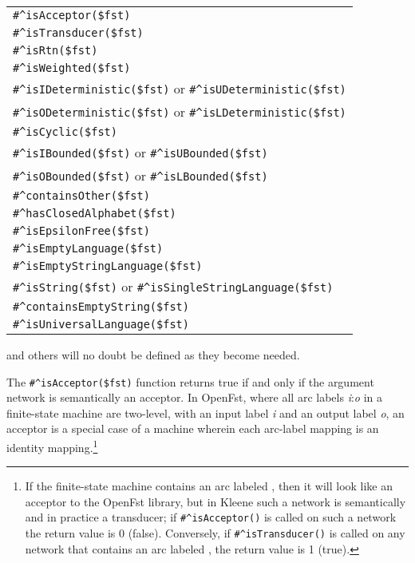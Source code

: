 \vspace{0.5cm}

\noindent
\begin{tabular}{|l|}
\hline
\verb!#^isAcceptor($fst)! \\
\verb!#^isTransducer($fst)! \\
\verb!#^isRtn($fst)! \\
\hline
\verb!#^isWeighted($fst)! \\
\verb!#^isIDeterministic($fst)! or \verb!#^isUDeterministic($fst)!\\
\verb!#^isODeterministic($fst)! or \verb!#^isLDeterministic($fst)!\\
\verb!#^isCyclic($fst)!\\
\verb!#^isIBounded($fst)! or \verb!#^isUBounded($fst)!\\
\verb!#^isOBounded($fst)! or \verb!#^isLBounded($fst)!\\
\verb!#^containsOther($fst)! \\
\verb!#^hasClosedAlphabet($fst)! \\
\verb!#^isEpsilonFree($fst)! \\
\hline
\verb!#^isEmptyLanguage($fst)! \\
\verb!#^isEmptyStringLanguage($fst)! \\
\verb!#^isString($fst)! or \verb!#^isSingleStringLanguage($fst)!\\
\verb!#^containsEmptyString($fst)! \\
\verb!#^isUniversalLanguage($fst)! \\
\hline
\end{tabular}

\vspace{0.5cm}
\noindent
and others will no doubt be defined as they become needed.

The \verb!#^isAcceptor($fst)! function returns true if and only if the
argument network is semantically an
acceptor.  In OpenFst, where all arc labels \emph{i}:\emph{o} in a finite-state machine
are two-level, with an input label \emph{i} and an output label \emph{o}, an acceptor is a special case of a
machine wherein each arc-label mapping is an identity mapping.\footnote{If the finite-state machine contains an arc labeled
, then it will look like an acceptor to the OpenFst library, but in Kleene such
a network is semantically and in practice a transducer; if \verb!#^isAcceptor()! is called on such
a network the return value is 0 (false).  Conversely, if
\verb!#^isTransducer()! is called on any network that
contains an arc labeled , the return value is 1 (true).}

